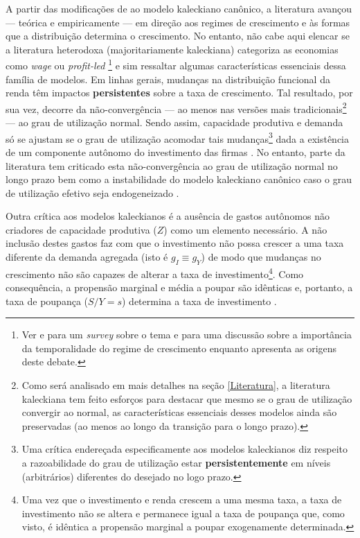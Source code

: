 A partir das modificações de \textcite{bhaduri_unemployment_1990} ao modelo kaleckiano canônico, a literatura avançou --- teórica e empiricamente --- em direção aos regimes de crescimento e às formas que a distribuição determina o crescimento.
No entanto, não  cabe aqui elencar se a  literatura heterodoxa (majoritariamente kaleckiana)  categoriza as economias como \textit{wage} ou \textit{profit-led}
\footnote{Ver 
	\textcite{setterfield_distribution_2002} 
	e \textcite{onaran_is_2013} para um  \textit{survey} sobre o tema e \textcite{blecker_wage_led_2016} para uma discussão sobre a importância da temporalidade do regime de crescimento enquanto \textcite{lavoie_origins_2017} apresenta as origens deste debate.} 
e sim ressaltar algumas  características essenciais dessa família de modelos. Em linhas gerais, mudanças na distribuição funcional da renda têm impactos \textbf{persistentes} sobre a taxa de crescimento. 
Tal resultado, por sua vez, decorre da não-convergência --- ao menos nas versões mais tradicionais\footnote{Como será analisado em mais detalhes na seção \ref{Literatura}, a literatura kaleckiana tem feito esforços para destacar que mesmo se o grau de utilização convergir ao normal, as características essenciais desses modelos ainda são preservadas (ao menos ao longo da transição para o longo prazo).} --- ao grau de utilização normal. Sendo assim, capacidade produtiva e demanda só se ajustam se o grau de utilização acomodar tais mudanças\footnote{Uma crítica endereçada especificamente aos modelos kaleckianos diz respeito a razoabilidade do grau de utilização estar \textbf{persistentemente} em níveis (arbitrários) diferentes do desejado no logo prazo.} dada a existência de um componente autônomo do investimento das firmas \cite[p.~84--86]{serrano_sraffian_2017}.
No entanto, parte da literatura tem criticado esta não-convergência ao grau de utilização normal no longo prazo \cites{skott_finance_1988}{skott_theoretical_2012}
bem como a instabilidade do modelo kaleckiano canônico caso o grau de utilização efetivo seja endogeneizado \cites{hein_harrodian_2012}{allain_tackling_2015}{nah_long-run_2017}.

Outra crítica aos modelos kaleckianos é a ausência de gastos autônomos não criadores de capacidade produtiva ($Z$) como um elemento necessário.
A não inclusão destes gastos faz com que o investimento não possa crescer a uma taxa diferente da demanda agregada (isto é $g_I \equiv g_Y$) de modo que mudanças no crescimento não são capazes de alterar a taxa de investimento\footnote{Uma vez que o investimento e renda crescem a uma mesma taxa, a taxa de investimento não se altera e permanece igual a taxa de poupança que, como visto, é idêntica a propensão marginal a poupar exogenamente determinada.}. 
Como consequência, a propensão marginal e média a poupar são idênticas e, portanto, a taxa de poupança ($S/Y = s$) determina a taxa de investimento \cite[p.~5--7]{fagundes_role_2017}.

